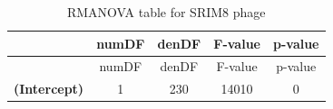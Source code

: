 \documentclass[]{article}
\begin{document}
\begin{longtable}[]{@{}ccccc@{}}
\caption{RMANOVA table for SRIM8 phage}\tabularnewline
\toprule
\begin{minipage}[b]{0.21\columnwidth}\centering\strut
~\strut
\end{minipage} & \begin{minipage}[b]{0.10\columnwidth}\centering\strut
numDF\strut
\end{minipage} & \begin{minipage}[b]{0.10\columnwidth}\centering\strut
denDF\strut
\end{minipage} & \begin{minipage}[b]{0.12\columnwidth}\centering\strut
F-value\strut
\end{minipage} & \begin{minipage}[b]{0.12\columnwidth}\centering\strut
p-value\strut
\end{minipage}\tabularnewline
\midrule
\endfirsthead
\toprule
\begin{minipage}[b]{0.21\columnwidth}\centering\strut
~\strut
\end{minipage} & \begin{minipage}[b]{0.10\columnwidth}\centering\strut
numDF\strut
\end{minipage} & \begin{minipage}[b]{0.10\columnwidth}\centering\strut
denDF\strut
\end{minipage} & \begin{minipage}[b]{0.12\columnwidth}\centering\strut
F-value\strut
\end{minipage} & \begin{minipage}[b]{0.12\columnwidth}\centering\strut
p-value\strut
\end{minipage}\tabularnewline
\midrule
\endhead
\begin{minipage}[t]{0.21\columnwidth}\centering\strut
\textbf{(Intercept)}\strut
\end{minipage} & \begin{minipage}[t]{0.10\columnwidth}\centering\strut
1\strut
\end{minipage} & \begin{minipage}[t]{0.10\columnwidth}\centering\strut
230\strut
\end{minipage} & \begin{minipage}[t]{0.12\columnwidth}\centering\strut
14010\strut
\end{minipage} & \begin{minipage}[t]{0.12\columnwidth}\centering\strut
0\strut

\end{minipage}
\end{longtable}
\end{document}

